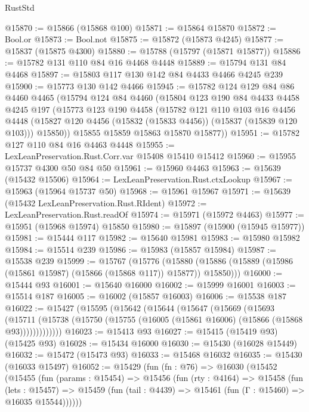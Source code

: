 \begin{lexlean}{RustStd}
\begin{coremodule}
@15870 := @15866 (@15868 @100)
@15871 := @15864 @15870
@15872 := Bool.or
@15873 := Bool.not
@15875 := @15872 (@15873 @4245)
@15877 := @15837 (@15875 @4300)
@15880 := @15788 (@15797 (@15871 @15877))
@15886 := @15782 @131 @110 @84 @16 @4468 @4448
@15889 := @15794 @131 @84 @4468
@15897 := @15803 @117 @130 @142 @84 @4433 @4466 @4245 @239
@15900 := @15773 @130 @142 @4466
@15945 := @15782
    @124
    @129
    @84
    @86
    @4460
    @4465
    (@15794
      @124
      @84
      @4460
      (@15804
        @123
        @190
        @84
        @4433
        @4458
        @4245
        @197
        (@15773
          @123
          @190
          @4458
          (@15782
            @121
            @110
            @103
            @16
            @4456
            @4448
            (@15827 @120 @4456 (@15832 (@15833 @4456)) (@15837 (@15839 @120 @103)))
            @15850))
        @15855
        @15859
        @15863
        @15870
        @15877))
@15951 := @15782 @127 @110 @84 @16 @4463 @4448
@15955 := LexLeanPreservation.Rust.Corr.var @15408 @15410 @15412
@15960 := @15955 @15737 @4300 @50 @84 @50
@15961 := @15960 @4463
@15963 := @15639 (@15432 @15506)
@15964 := LexLeanPreservation.Rust.ctxLookup
@15967 := @15963 (@15964 @15737 @50)
@15968 := @15961 @15967
@15971 := @15639 (@15432 LexLeanPreservation.Rust.RIdent)
@15972 := LexLeanPreservation.Rust.readOf
@15974 := @15971 (@15972 @4463)
@15977 := @15951 (@15968 @15974) @15850
@15980 := @15897 (@15900 (@15945 @15977))
@15981 := @15444 @117
@15982 := @15640 @15981
@15983 := @15980 @15982
@15984 := @15514 @239
@15986 := @15983 (@15857 @15984)
@15987 := @15538 @239
@15999 := @15767
    (@15776
      (@15880 (@15886 (@15889 (@15986 (@15861 @15987) (@15866 (@15868 @117)) @15877)) @15850)))
@16000 := @15444 @93
@16001 := @15640 @16000
@16002 := @15999 @16001
@16003 := @15514 @187
@16005 := @16002 (@15857 @16003)
@16006 := @15538 @187
@16022 := @15427
    (@15595
      (@15642
        (@15644
          (@15647
            (@15669
              (@15693
                (@15711
                  (@15738 (@15750 (@15755 (@16005 (@15861 @16006) (@15866 (@15868 @93)))))))))))))
@16023 := @15413 @93
@16027 := @15415 (@15419 @93) (@15425 @93)
@16028 := @15434 @16000
@16030 := @15430 (@16028 @15449)
@16032 := @15472 (@15473 @93)
@16033 := @15468 @16032
@16035 := @15430 (@16033 @15497)
@16052 := @15429
    (fun (fn : @76) =>
    @16030
      (@15452
        (@15455
          (fun (params : @15454) =>
          @15456
            (fun (rty : @4164) =>
            @15458
              (fun (lets : @15457) =>
              @15459 (fun (tail : @4439) => @15461 (fun (Γ : @15460) => @16035 @15544))))))

\end{coremodule}
\end{lexlean}
